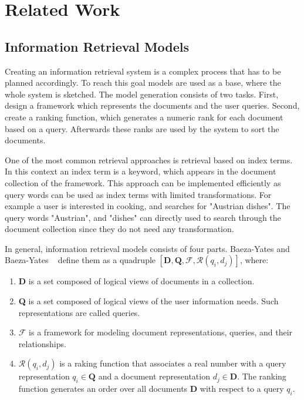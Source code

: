 \chapter{Related Work}
\label{cha:related_work}

\section{Information Retrieval Models}
\label{sec:information_retrieval_models}

Creating an information retrieval system is a complex process that has to be planned accordingly. To reach this goal models are used as a base, where the whole system is sketched. The model generation consists of two tasks. First, design a framework which represents the documents and the user queries. Second, create a ranking function, which generates a numeric rank for each document based on a query. Afterwards these ranks are used by the system to sort the documents.

One of the most common retrieval approaches is retrieval based on index terms. In this context an index term is a keyword, which appears in the document collection of the framework. This approach can be implemented efficiently as query words can be used as index terms with limited transformations. For example a user is interested in cooking, and searches for "Austrian dishes". The query words "Austrian", and "dishes" can directly used to search through the document collection since they do not need any transformation.

In general, information retrieval models consists of four parts. Baeza-Yates and Baeza-Yates ~\cite{ModernInvormationRetrieval1999} define them as a quadruple $[\textbf{D}, \textbf{Q}, \mathcal{F}, \mathcal{R}(q_i, d_j)]$, where:

\begin{enumerate}
  \item \textbf{D} is a set composed of logical views of documents in a collection.
  \item \textbf{Q} is a set composed of logical views of the user information needs. Such representations are called queries.
  \item $\mathcal{F}$ is a framework for modeling document representations, queries, and their relationships.
  \item $\mathcal{R}(q_i, d_j)$ is a raking function that associates a real number with a query representation $q_i \in \textbf{Q}$ and a document representation $d_j \in \textbf{D}$. The ranking function generates an order over all documents \textbf{D} with respect to a query $q_i$.
\end{enumerate}

